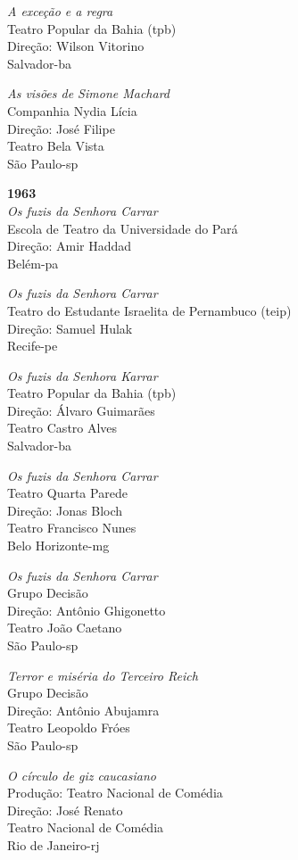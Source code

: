 {\it A exceção e a regra}\\
Teatro Popular da Bahia ({\sc tpb})\\
Direção: Wilson Vitorino\\
Salvador-{\sc ba}

{\it As visões de Simone Machard}\\
Companhia Nydia Lícia\\
Direção: José Filipe\\
Teatro Bela Vista\\
São Paulo-{\sc sp}

\item{\bf 1963}\\
{\it Os fuzis da Senhora Carrar}\\
Escola de Teatro da Universidade do Pará\\
Direção: Amir Haddad\\
Belém-{\sc pa}

{\it Os fuzis da Senhora Carrar}\\
Teatro do Estudante Israelita de Pernambuco ({\sc teip})\\
Direção: Samuel Hulak\\
Recife-{\sc pe}

{\it Os fuzis da Senhora Karrar}\\
Teatro Popular da Bahia ({\sc tpb})\\
Direção: Álvaro Guimarães\\
Teatro Castro Alves\\
Salvador-{\sc ba}

{\it Os fuzis da Senhora Carrar}\\
Teatro Quarta Parede\\
Direção: Jonas Bloch\\
Teatro Francisco Nunes\\
Belo Horizonte-{\sc mg}

{\it Os fuzis da Senhora Carrar}\\
Grupo Decisão\\
Direção: Antônio Ghigonetto\\
Teatro João Caetano\\
São Paulo-{\sc sp}

{\it Terror e miséria do Terceiro Reich}\\
Grupo Decisão\\
Direção: Antônio Abujamra\\
Teatro Leopoldo Fróes\\
São Paulo-{\sc sp}

{\it O círculo de giz caucasiano}\\
Produção: Teatro Nacional de Comédia\\
Direção: José Renato\\
Teatro Nacional de Comédia\\
Rio de Janeiro-{\sc rj}

